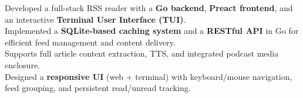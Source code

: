 \documentclass[]{Nikhil_Kadiyan_Resume}
\begin{document}


\pt Developed a full-stack RSS reader with a \textbf{Go backend}, \textbf{Preact frontend}, and an interactive \textbf{Terminal User Interface (TUI)}.\\
\pt Implemented a \textbf{SQLite-based caching system} and a \textbf{RESTful API} in Go for efficient feed management and content delivery.\\
\pt Supports full article content extraction, TTS, and integrated podcast media enclosure.\\
\pt Designed a \textbf{responsive UI} (web + terminal) with keyboard/mouse navigation, feed grouping, and persistent read/unread tracking.\\
\sectionsep
\end{document}
